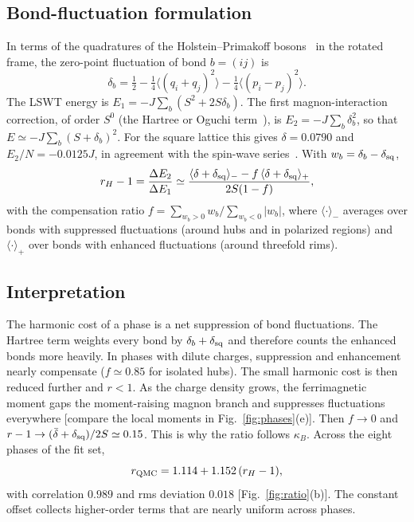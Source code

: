 \documentclass[aps,prb,twocolumn,superscriptaddress,floatfix]{revtex4-2}
\begin{document}
\subsection{Bond-fluctuation formulation}

In terms of the quadratures of the Holstein--Primakoff bosons~\cite{Holstein1940} in the rotated frame, the zero-point fluctuation of bond $b=(ij)$ is
\begin{equation}
\delta_b=\tfrac12-\tfrac14\big\langle(q_i+q_j)^2\big\rangle-\tfrac14\big\langle(p_i-p_j)^2\big\rangle .
\end{equation}
The LSWT energy is $E_1=-J\sum_b(S^2+2S\delta_b)$. The first magnon-interaction correction, of order $S^0$ (the Hartree or Oguchi term~\cite{Oguchi1960}), is $E_2=-J\sum_b\delta_b^2$, so that $E\simeq-J\sum_b(S+\delta_b)^2$. For the square lattice this gives $\delta=0.0790$ and $E_2/N=-0.0125J$, in agreement with the spin-wave series~\cite{Hamer1992}. With $w_b=\delta_b-\delta_{\rm sq}$,
\begin{equation}
r_H-1=\frac{\Delta E_2}{\Delta E_1}\simeq\frac{\langle\delta+\delta_{\rm sq}\rangle_--f\,\langle\delta+\delta_{\rm sq}\rangle_+}{2S(1-f)},
\label{eq:rH}
\end{equation}
with the compensation ratio $f=\sum_{w_b>0}w_b\big/\sum_{w_b<0}|w_b|$,
where $\langle\cdot\rangle_-$ averages over bonds with suppressed fluctuations (around hubs and in polarized regions) and $\langle\cdot\rangle_+$ over bonds with enhanced fluctuations (around threefold rims).

\subsection{Interpretation}

The harmonic cost of a phase is a net suppression of bond fluctuations. The Hartree term weights every bond by $\delta_b+\delta_{\rm sq}$ and therefore counts the enhanced bonds more heavily. In phases with dilute charges, suppression and enhancement nearly compensate ($f\simeq0.85$ for isolated hubs). The small harmonic cost is then reduced further and $r<1$. As the charge density grows, the ferrimagnetic moment gaps the moment-raising magnon branch and suppresses fluctuations everywhere [compare the local moments in Fig.~\ref{fig:phases}(e)]. Then $f\to0$ and $r-1\to(\bar\delta+\delta_{\rm sq})/2S\simeq0.15$. This is why the ratio follows $\kappa_B$. Across the eight phases of the fit set,
\begin{equation}
r_{\rm QMC}=1.114+1.152\,(r_H-1),
\label{eq:fit}
\end{equation}
with correlation $0.989$ and rms deviation $0.018$ [Fig.~\ref{fig:ratio}(b)]. The constant offset collects higher-order terms that are nearly uniform across phases.
\end{document}
